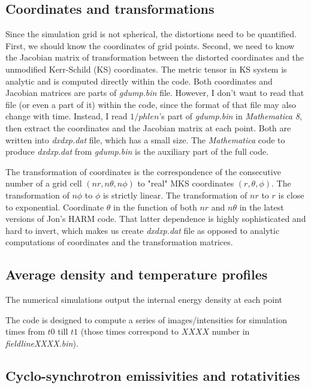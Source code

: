 \documentclass{emulateapjx}
\begin{document}
\subsection{Coordinates and transformations}
Since the simulation grid is not spherical, the distortions need to be quantified. 
First, we should know the coordinates of grid points. Second, we need to know the Jacobian matrix of transformation between the distorted coordinates and the unmodified Kerr-Schild (KS) coordinates. The metric tensor in KS system is analytic and is computed directly within the code.
Both coordinates and Jacobian matrices are parts of \textit{gdump.bin} file. However, I don't want to read that file (or even a part of it) within the code, since the format of that file
may also change with time. Instead, I read $1/phlen$'s part of \textit{gdump.bin} in \textit{Mathematica 8}, then extract the coordinates and the Jacobian matrix at each point.
Both are written into \textit{dxdxp.dat} file, which has a small size. 
The \textit{Mathematica} code to produce \textit{dxdxp.dat} from \textit{gdump.bin} is the auxiliary part of the full code.

The transformation of coordinates is the correspondence of the consecutive number of a grid cell $(nr,n\theta,n\phi)$ to "real" MKS coordinates $(r,\theta,\phi)$.
The transformation of $n\phi$ to $\phi$ is strictly linear. The transformation of $nr$ to $r$ is close to exponential.
Coordinate $\theta$ in the function of both $nr$ and $n\theta$ in the latest versions of Jon's HARM code. 
That latter dependence is highly sophisticated and hard to invert, which makes us create \textit{dxdxp.dat} file as opposed to analytic computations of coordinates and the transformation matrices.

\subsection{Average density and temperature profiles}
The numerical simulations output the internal energy density at each point 
\citep{Narayan:1995kj}
\citep{Sharma_heating:2007}

The code is designed to compute a series of images/intensities for simulation times from $t0$ till $t1$ (those times correspond to $XXXX$ number in \textit{fieldlineXXXX.bin}).


\subsection{Cyclo-synchrotron emissivities and rotativities}
\end{document}
